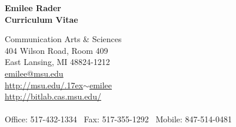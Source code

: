 \documentclass[9pt]{extarticle}
\newcommand{\mytilde}{\raise.17ex\hbox{$\scriptstyle\mathtt{\sim}$}}
\begin{document}
{\LARGE{\textbf{Emilee Rader}}}  \\ \vspace{3pt}
\textbf{Curriculum Vitae}


\begin{tabbing}
Communication Arts \& Sciences \hspace{1.5in}\=  \\
404 Wilson Road, Room 409 \\
East Lansing, MI 48824-1212 \\
\href{mailto:emilee@msu.edu}{emilee@msu.edu} \\
\href{http://msu.edu/~emilee}{http://msu.edu/\mytilde emilee}  \\
\href{http://bitlab.cas.msu.edu/}{http://bitlab.cas.msu.edu/}  \\\\
Office: 517-432-1334  \textpipe  ~Fax: 517-355-1292  \textpipe  ~Mobile: 847-514-0481 \\\\\\
\end{tabbing}



\end{document}
